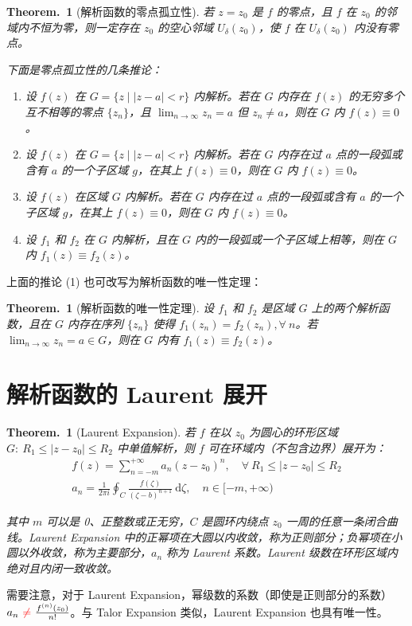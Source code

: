 \documentclass[UTF8]{report}
\theoremstyle{MyLineTheoremStyle} %
\theoremstyle{MyBlockTheoremStyle} %
\newtheorem{BlockTheorem}[LineTheorem]{Theorem.\,} %
\theoremstyle{MySubsubsectionStyle} %
\begin{document}
\begin{BlockTheorem}[解析函数的零点孤立性]\label{解析函数的零点孤立性}
若 $z = z_0$ 是 $f$ 的零点，且 $f$ 在 $z_0$ 的邻域内不恒为零，则一定存在 $z_0$ 的空心邻域 $U_{\delta}(z_0)$，使 $f$ 在 $U_{\delta}(z_0)$ 内没有零点。

下面是零点孤立性的几条推论：
\begin{enumerate}
\item 设 $f(z)$ 在 $G = \{z \mid | z - a | < r\}$ 内解析。若在 $G$ 内存在 $f(z)$ 的无穷多个互不相等的零点 $\{z_n\}$，且 $\lim_{n \to \infty} z_n = a$ 但 $z_n \ne a$，则在 $G$ 内 $f(z) \equiv 0$。
\item 设 $f(z)$ 在 $G = \{z \mid | z - a | < r\}$ 内解析。若在 $G$ 内存在过 $a$ 点的一段弧或含有 $a$ 的一个子区域 $g$，在其上 $f(z) \equiv 0$，则在 $G$ 内 $f(z) \equiv 0$。
\item 设 $f(z)$ 在区域 $G$ 内解析。若在 $G$ 内存在过 $a$ 点的一段弧或含有 $a$ 的一个子区域 $g$，在其上 $f(z) \equiv 0$，则在 $G$ 内 $f(z) \equiv 0$。
\item 设 $f_1$ 和 $f_2$ 在 $G$ 内解析，且在 $G$ 内的一段弧或一个子区域上相等，则在 $G$ 内 $f_1(z) \equiv f_2(z)$。
\end{enumerate}
\end{BlockTheorem}

上面的推论 (1) 也可改写为解析函数的唯一性定理：
\begin{BlockTheorem}[解析函数的唯一性定理]\label{解析函数的唯一性定理}
    设 $f_1$ 和 $f_2$ 是区域 $G$ 上的两个解析函数，且在 $G$ 内存在序列 $\{z_n\}$ 使得 $f_1(z_n) = f_2(z_n), \forall\ n$。若 $\lim_{n \to \infty} z_n = a \in G$，则在 $G$ 内有 $f_1(z) \equiv f_2(z)$。
\end{BlockTheorem}

\section{解析函数的 Laurent 展开}

\begin{BlockTheorem}[Laurent Expansion]\label{Laurent Expansion}
若 $f$ 在以 $z_0$ 为圆心的环形区域 $G:\  R_1 \leqslant | z - z_0 | \leqslant R_2$ 中单值解析，则 $f$ 可在环域内（不包含边界）展开为：
\begin{gather}
f(z) = \sum_{n = -m}^{+ \infty} a_n (z - z_0)^n,\quad  \forall\ R_1 \leqslant | z - z_0 | \leqslant R_2
\\ 
a_n = \displaystyle \frac{1}{2 \pi i}\oint_{C}\frac{f(\zeta)}{(\zeta - b)^{n+1}}\ \mathrm{d}\zeta,\quad n \in [-m, +\infty)
\end{gather}

其中 $m$ 可以是 0、正整数或正无穷，$C$ 是圆环内绕点 $z_0$ 一周的任意一条闭合曲线。Laurent Expansion 中的正幂项在大圆以内收敛，称为正则部分；负幂项在小圆以外收敛，称为主要部分，$a_n$ 称为 Laurent 系数。Laurent 级数在环形区域内绝对且内闭一致收敛。
\end{BlockTheorem}
需要注意，对于 Laurent Expansion，幂级数的系数{\color{red}（即使是正则部分的系数）} $a_n {\ \color{red} \ne\ } \frac{f^{(n)}(z_0)}{n!}$。与 Talor Expansion 类似，Laurent Expansion 也具有唯一性。
\end{document}
